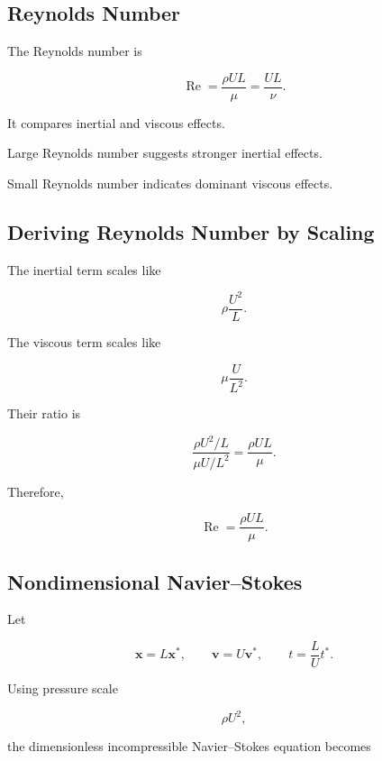 \subsection{Reynolds Number}
\label{subsec:reynolds-number}

The Reynolds number is

\[
\boxed{
\operatorname{Re}
=
\frac{\rho UL}{\mu}
=
\frac{UL}{\nu}.
}
\]

It compares inertial and viscous effects.

Large Reynolds number suggests stronger inertial effects.

Small Reynolds number indicates dominant viscous effects.

\subsection{Deriving Reynolds Number by Scaling}
\label{subsec:reynolds-scaling}

The inertial term scales like

\[
\boxed{
\rho
\frac{U^2}{L}.
}
\]

The viscous term scales like

\[
\boxed{
\mu
\frac{U}{L^2}.
}
\]

Their ratio is

\[
\frac{
\rho U^2/L
}{
\mu U/L^2
}
=
\frac{\rho UL}{\mu}.
\]

Therefore,

\[
\boxed{
\operatorname{Re}
=
\frac{\rho UL}{\mu}.
}
\]

\subsection{Nondimensional Navier--Stokes}
\label{subsec:nondimensional-navier-stokes}

Let

\[
\mathbf{x}
=
L\mathbf{x}^*,
\qquad
\mathbf{v}
=
U\mathbf{v}^*,
\qquad
t
=
\frac{L}{U}t^*.
\]

Using pressure scale

\[
\rho U^2,
\]

the dimensionless incompressible Navier--Stokes equation becomes

